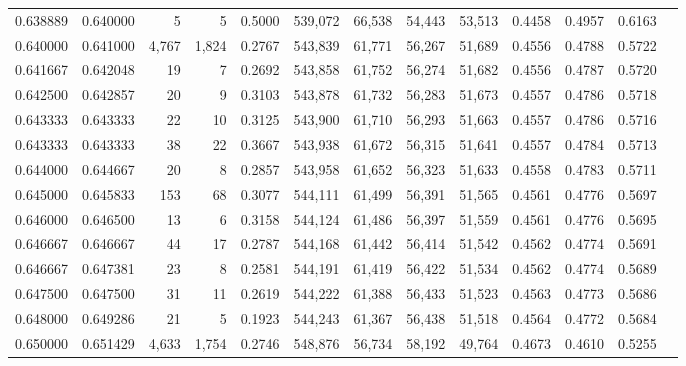 \begin{tabular}{rrrrrrrrrrrrr}
0.638889 & 0.640000 &      5 &     5 &                                     0.5000 & 539,072 &  66,538 &  54,443 &  53,513 & 0.4458 & 0.4957 & 0.6163 \\
0.640000 & 0.641000 &  4,767 & 1,824 &                                     0.2767 & 543,839 &  61,771 &  56,267 &  51,689 & 0.4556 & 0.4788 & 0.5722 \\
0.641667 & 0.642048 &     19 &     7 &                                     0.2692 & 543,858 &  61,752 &  56,274 &  51,682 & 0.4556 & 0.4787 & 0.5720 \\
0.642500 & 0.642857 &     20 &     9 &                                     0.3103 & 543,878 &  61,732 &  56,283 &  51,673 & 0.4557 & 0.4786 & 0.5718 \\
0.643333 & 0.643333 &     22 &    10 &                                     0.3125 & 543,900 &  61,710 &  56,293 &  51,663 & 0.4557 & 0.4786 & 0.5716 \\
0.643333 & 0.643333 &     38 &    22 &                                     0.3667 & 543,938 &  61,672 &  56,315 &  51,641 & 0.4557 & 0.4784 & 0.5713 \\
0.644000 & 0.644667 &     20 &     8 &                                     0.2857 & 543,958 &  61,652 &  56,323 &  51,633 & 0.4558 & 0.4783 & 0.5711 \\
0.645000 & 0.645833 &    153 &    68 &                                     0.3077 & 544,111 &  61,499 &  56,391 &  51,565 & 0.4561 & 0.4776 & 0.5697 \\
0.646000 & 0.646500 &     13 &     6 &                                     0.3158 & 544,124 &  61,486 &  56,397 &  51,559 & 0.4561 & 0.4776 & 0.5695 \\
0.646667 & 0.646667 &     44 &    17 &                                     0.2787 & 544,168 &  61,442 &  56,414 &  51,542 & 0.4562 & 0.4774 & 0.5691 \\
0.646667 & 0.647381 &     23 &     8 &                                     0.2581 & 544,191 &  61,419 &  56,422 &  51,534 & 0.4562 & 0.4774 & 0.5689 \\
0.647500 & 0.647500 &     31 &    11 &                                     0.2619 & 544,222 &  61,388 &  56,433 &  51,523 & 0.4563 & 0.4773 & 0.5686 \\
0.648000 & 0.649286 &     21 &     5 &                                     0.1923 & 544,243 &  61,367 &  56,438 &  51,518 & 0.4564 & 0.4772 & 0.5684 \\
0.650000 & 0.651429 &  4,633 & 1,754 &                                     0.2746 & 548,876 &  56,734 &  58,192 &  49,764 & 0.4673 & 0.4610 & 0.5255 \\

\end{tabular}

